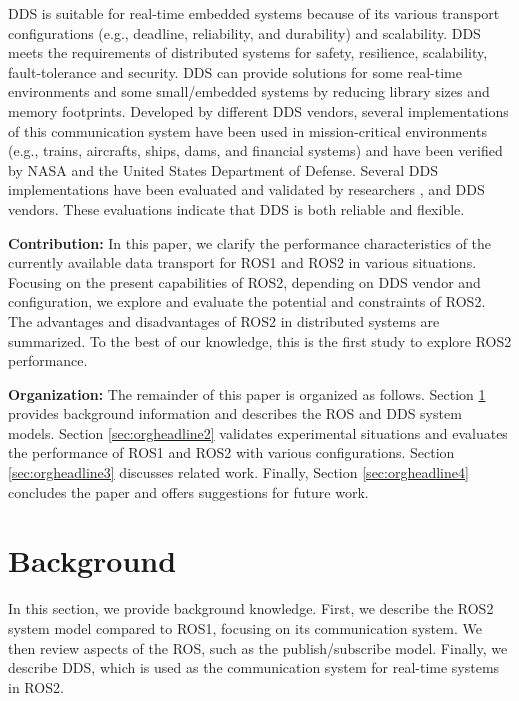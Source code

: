 \documentclass{sig-alternate-05-2015}
\begin{document}
DDS is suitable for real-time embedded systems because of its various transport configurations (e.g., deadline, reliability, and durability) and scalability.
DDS meets the requirements of distributed systems for safety, resilience, scalability, fault-tolerance and security.
DDS can provide solutions for some real-time environments and some small/embedded systems by reducing library sizes and memory footprints.
Developed by different DDS vendors, several implementations of this communication system have been used in mission-critical environments (e.g., trains, aircrafts, ships, dams, and financial systems) and have been verified by NASA and the United States Department of Defense. 
Several DDS implementations have been evaluated and validated by researchers \cite{xiong2010evaluating}, \cite{sierla2003evaluation} and DDS vendors.
These evaluations indicate that DDS is both reliable and flexible.

\textbf{Contribution:} 
In this paper, we clarify the performance characteristics of the currently available data transport for ROS1 and ROS2 in various situations. 
Focusing on the present capabilities of ROS2, depending on DDS vendor and configuration, we explore and evaluate the potential and constraints of ROS2.
The advantages and disadvantages of ROS2 in distributed systems are summarized. 
To the best of our knowledge, this is the first study to explore ROS2 performance.

\textbf{Organization:} 
The remainder of this paper is organized as follows. 
Section \ref{sec:orgheadline1} provides background information and describes the ROS and DDS system models. 
Section \ref{sec:orgheadline2} validates experimental situations and evaluates the performance of ROS1 and ROS2 with various configurations. 
Section \ref{sec:orgheadline3} discusses related work. 
Finally, Section \ref{sec:orgheadline4} concludes the paper and offers suggestions for future work.


\section{Background}
\label{sec:orgheadline1}

In this section, we provide background knowledge. 
First, we describe the ROS2 system model compared to ROS1, focusing on its communication system. 
We then review aspects of the ROS, such as the publish/subscribe model. 
Finally, we describe DDS, which is used as the communication system for real-time systems in ROS2. 
\end{document}
